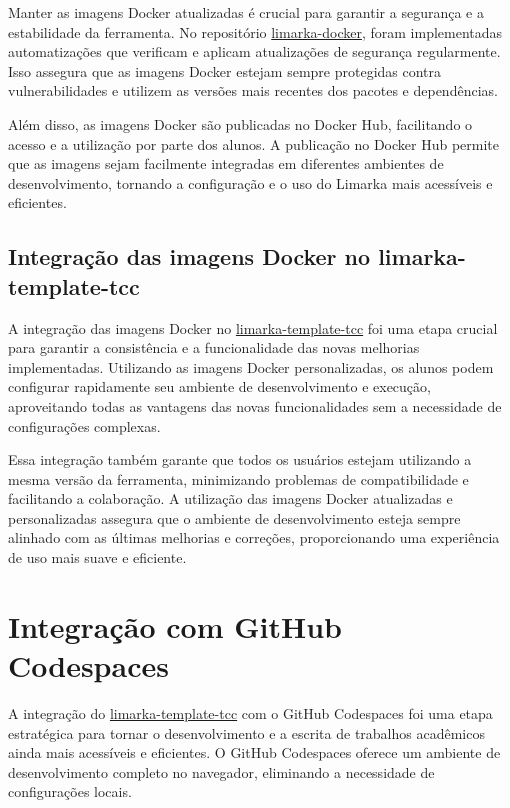 \documentclass[
	12pt,				%
	oneside,			%
	a4paper,			%
	english,			%
	french,				%
	spanish,			%
	brazil				%
	]{abntex2}
\begin{document}
Manter as imagens Docker atualizadas é crucial para garantir a segurança
e a estabilidade da ferramenta. No repositório
\href{https://github.com/ReinanHS/limarka-docker}{limarka-docker}, foram
implementadas automatizações que verificam e aplicam atualizações de
segurança regularmente. Isso assegura que as imagens Docker estejam
sempre protegidas contra vulnerabilidades e utilizem as versões mais
recentes dos pacotes e dependências.

Além disso, as imagens Docker são publicadas no Docker Hub, facilitando
o acesso e a utilização por parte dos alunos. A publicação no Docker Hub
permite que as imagens sejam facilmente integradas em diferentes
ambientes de desenvolvimento, tornando a configuração e o uso do Limarka
mais acessíveis e eficientes.

\hypertarget{integrauxe7uxe3o-das-imagens-docker-no-limarka-template-tcc}{%
\subsection{Integração das imagens Docker no
limarka-template-tcc}\label{integrauxe7uxe3o-das-imagens-docker-no-limarka-template-tcc}}

A integração das imagens Docker no
\href{https://github.com/ReinanHS/limarka-template-tcc}{limarka-template-tcc}
foi uma etapa crucial para garantir a consistência e a funcionalidade
das novas melhorias implementadas. Utilizando as imagens Docker
personalizadas, os alunos podem configurar rapidamente seu ambiente de
desenvolvimento e execução, aproveitando todas as vantagens das novas
funcionalidades sem a necessidade de configurações complexas.

Essa integração também garante que todos os usuários estejam utilizando
a mesma versão da ferramenta, minimizando problemas de compatibilidade e
facilitando a colaboração. A utilização das imagens Docker atualizadas e
personalizadas assegura que o ambiente de desenvolvimento esteja sempre
alinhado com as últimas melhorias e correções, proporcionando uma
experiência de uso mais suave e eficiente.

\hypertarget{integrauxe7uxe3o-com-github-codespaces}{%
\section{Integração com GitHub
Codespaces}\label{integrauxe7uxe3o-com-github-codespaces}}

A integração do
\href{https://github.com/ReinanHS/limarka-template-tcc}{limarka-template-tcc}
com o GitHub Codespaces foi uma etapa estratégica para tornar o
desenvolvimento e a escrita de trabalhos acadêmicos ainda mais
acessíveis e eficientes. O GitHub Codespaces oferece um ambiente de
desenvolvimento completo no navegador, eliminando a necessidade de
configurações locais.
\end{document}
